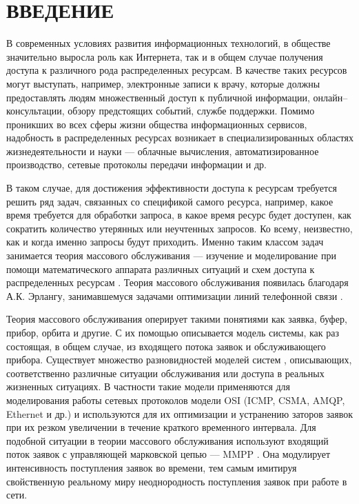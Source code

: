 \section*{ВВЕДЕНИЕ}
В современных условиях развития информационных технологий, в обществе значительно выросла роль как Интернета, так и в общем случае получения доступа к различного рода распределенных ресурсам. В качестве таких ресурсов могут выступать, например, электронные записи к врачу, которые должны предоставлять людям множественный доступ к публичной информации, онлайн--консультации, обзору предстоящих событий, службе поддержки. Помимо проникших во всех сферы жизни общества информационных сервисов, надобность в распределенных ресурсах возникает в специализированных областях жизнедеятельности и науки --- облачные вычисления, автоматизированное производство, сетевые протоколы передачи информации и др.

В таком случае, для достижения эффективности доступа к ресурсам требуется решить ряд задач, связанных со спецификой самого ресурса, например, какое время требуется для обработки запроса, в какое время ресурс будет доступен, как сократить количество утерянных или неучтенных запросов. Ко всему, неизвестно, как и когда именно запросы будут приходить. Именно таким классом задач занимается теория массового обслуживания --- изучение и моделирование при помощи математического аппарата различных ситуаций и схем доступа к распределенных ресурсам \cite{nazarov2010theory}. Теория массового обслуживания появилась благодаря  А.К. Эрлангу, занимавшемуся задачами оптимизации линий телефонной связи \cite{erlang1909theory}.

Теория массового обслуживания оперирует такими понятиями как заявка, буфер, прибор, орбита и другие. С их помощью описывается модель системы, как раз состоящая, в общем случае, из входящего потока заявок и обслуживающего прибора. Существует множество разновидностей моделей систем \cite{phung2019retrial,artalejo2010accessible}, описывающих, соответственно различные ситуации обслуживания или доступа в реальных жизненных ситуациях. В частности такие модели применяются для моделирования работы сетевых протоколов модели OSI (ICMP, CSMA, AMQP, Ethernet и др.) \cite{bellovin2003icmp,bjornstad2006traffic,kritzinger1986performance,olypher2010computer} и используются для их оптимизации и устранению заторов заявок при их резком увеличении в течение краткого временного интервала. Для подобной ситуации в теории массового обслуживания используют входящий поток заявок с управляющей марковской цепью --- MMPP \cite{baiocchi1993steady,2019asymptotic}. Она модулирует интенсивность поступления заявок во времени, тем самым имитируя свойственную реальному миру неоднородность поступления заявок при работе в сети.
 
